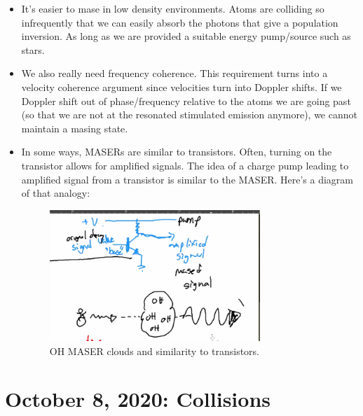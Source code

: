 \documentclass{article}
\begin{document}
\begin{itemize}
    \item It's easier to mase in low density environments. Atoms are colliding so infrequently that we can easily absorb the photons that give a population inversion. As long as we are provided a suitable energy pump/source such as stars.
    
    \item We also really need frequency coherence. This requirement turns into a velocity coherence argument since velocities turn into Doppler shifts. If we Doppler shift out of phase/frequency relative to the atoms we are going past (so that we are not at the resonated stimulated emission anymore), we cannot maintain a masing state. 
    
    \item In some ways, MASERs are similar to transistors. Often, turning on the transistor allows for amplified signals. The idea of a charge pump leading to amplified signal from a transistor is similar to the MASER. Here's a diagram of that analogy:
    
    \begin{figure}
        \centering
        \includegraphics[width=0.75\textwidth]{Screen Shot 2020-10-06 at 12.32.31 PM.png}
        \caption{OH MASER clouds and similarity to transistors. }
        \label{fig:transistor}
    \end{figure}
\end{itemize}




\newpage
\section{October 8, 2020: Collisions}
\end{document}
